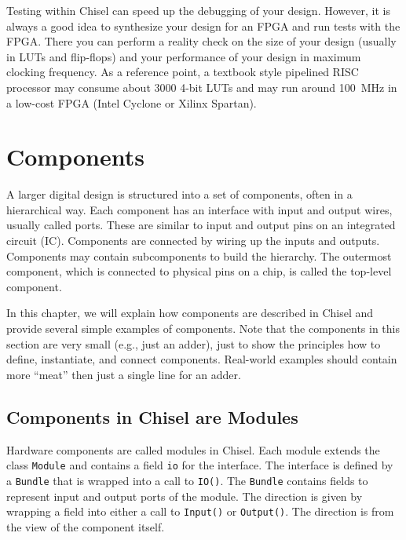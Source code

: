 \documentclass[%
    10pt,
    headinclude, footexclude,
    openright, %
    notitlepage,
    cleardoubleempty,
    headsepline,
    pointlessnumbers,
    bibtotoc, idxtotoc,
    ]{scrbook}
\newcommand{\code}[1]{{\small{\texttt{#1}}}}
\begin{document}
Testing within Chisel can speed up the debugging of your design.
However, it is always a good idea to synthesize your design for an FPGA and run tests
with the FPGA. There you can perform a reality check on the size of your design (usually
in LUTs and flip-flops) and your performance of your design in maximum clocking frequency.
As a reference point, a textbook style pipelined RISC processor may consume about 3000
4-bit LUTs and may run around 100~MHz in a low-cost FPGA (Intel Cyclone or
Xilinx Spartan).


\chapter{Components}


A larger digital design is structured into a set of components, often in
a hierarchical way. Each component has an interface with input and output
wires, usually called ports. These are similar to input and output pins on an integrated circuit (IC).
Components are connected by wiring up the inputs and outputs.
Components may contain subcomponents to build the hierarchy.
The outermost component, which is connected to physical pins
on a chip, is called the top-level component.

In this chapter, we will explain how components are described in Chisel and
provide several simple examples of components.
Note that the components in this section are very small (e.g., just an adder),
just to show the principles how to define, instantiate, and connect components.
Real-world examples should contain more ``meat'' then just a single line for
an adder.

\section{Components in Chisel are Modules}


Hardware components are called modules in Chisel. Each module extends
the class \code{Module} and contains a field \code{io} for the interface.
The interface is defined by a \code{Bundle} that is wrapped into a call to \code{IO()}.
The \code{Bundle} contains fields to represent input and output ports of
the module. The direction is given by wrapping a field into either a call to \code{Input()}
or \code{Output()}. The direction is from the view of the component itself.
\end{document}
